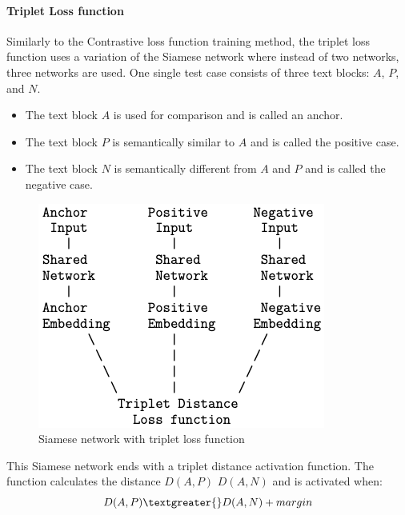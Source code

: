 \documentclass{wseas}
\begin{document}
\paragraph{Triplet Loss function}
Similarly to the Contrastive loss function training method, the triplet
loss function uses a variation of the Siamese network where instead of
two networks, three networks are used. One single test case consists of
three text blocks: \(A\), \(P\), and \(N\). 
\begin{itemize}
  \item The text block \(A\) is used for comparison and is called an anchor.
  \item The text block \(P\) is semantically similar to \(A\) and is called the positive case.
  \item The text block \(N\) is semantically different from \(A\) and \(P\) and is called the negative case.
\end{itemize}

\begin{figure}[htbp]
  \centering
  \includegraphics[width=\linewidth]{resources/v1/tripletLoss.png}
  \caption{Siamese network with triplet loss function}
  \label{fig:triplet_loss_function_figure}
\end{figure}

This Siamese network ends with a triplet distance activation function.
The function calculates the distance \(D(A,P)\) \(D(A,N)\) and is
activated when:
\begin{equation}
  D(A,P) \textgreater{} D(A,N) + margin
\end{equation}
\end{document}
